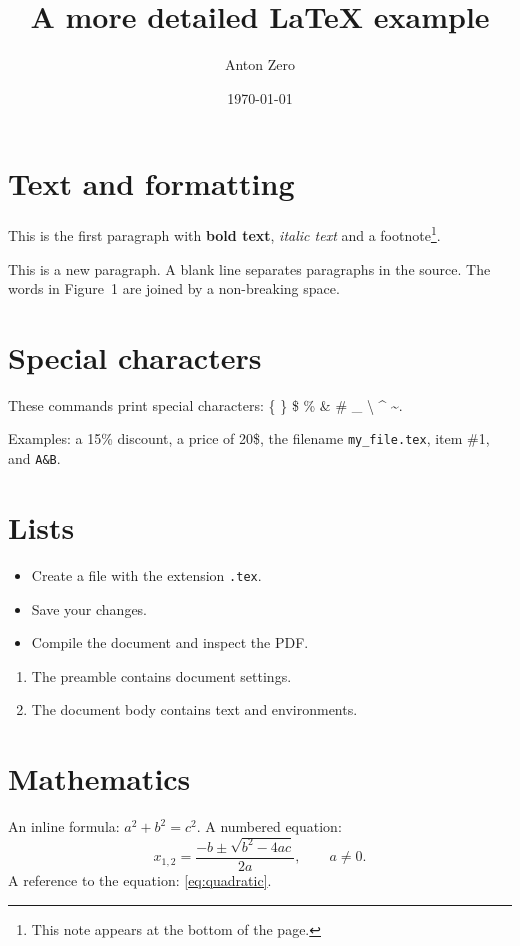 \documentclass[a4paper,12pt]{article}
\title{A more detailed LaTeX example}
\author{Anton Zero}
\date{\today}
\begin{document}
\maketitle

\section{Text and formatting}
This is the first paragraph with \textbf{bold text}, \textit{italic text}
and a footnote\footnote{This note appears at the bottom of the page.}.

This is a new paragraph. A blank line separates paragraphs in the source.
The words in Figure~1 are joined by a non-breaking space.

\section{Special characters}
These commands print special characters:
\{ \} \$ \% \& \# \_ \textbackslash{} \textasciicircum{} \textasciitilde{}.

Examples: a 15\% discount, a price of 20\$, the filename
\texttt{my\_file.tex}, item \#1, and \texttt{A\&B}.

\section{Lists}
\begin{itemize}
  \item Create a file with the extension \texttt{.tex}.
  \item Save your changes.
  \item Compile the document and inspect the PDF.
\end{itemize}

\begin{enumerate}
  \item The preamble contains document settings.
  \item The document body contains text and environments.
\end{enumerate}

\section{Mathematics}
An inline formula: \(a^2+b^2=c^2\).
A numbered equation:
\begin{equation}
  \label{eq:quadratic}
  x_{1,2}=\frac{-b\pm\sqrt{b^2-4ac}}{2a}, \qquad a\ne 0.
\end{equation}
A reference to the equation: \eqref{eq:quadratic}.
\end{document}
